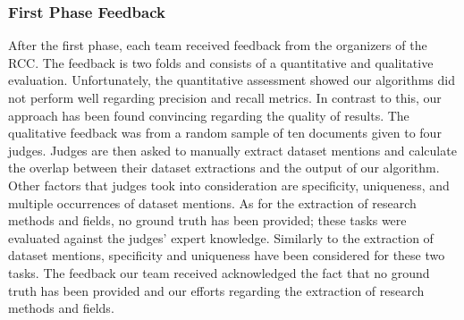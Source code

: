 \subsubsection{First Phase Feedback}
After the first phase, each team received feedback from the organizers of the RCC.
The feedback is two folds and consists of a quantitative and qualitative evaluation. Unfortunately, the quantitative assessment showed our algorithms did not perform well regarding precision and recall metrics. In contrast to this, our approach has been found convincing regarding the quality of results. The qualitative feedback was from a random sample of ten documents given to four judges.
Judges are then asked to manually extract dataset mentions and calculate the overlap between their dataset extractions and the output of our algorithm.
Other factors that judges took into consideration are specificity, uniqueness, and multiple occurrences of dataset mentions.
As for the extraction of research methods and fields, no ground truth has been provided; these tasks were evaluated against the judges' expert knowledge.
Similarly to the extraction of dataset mentions, specificity and uniqueness have been considered for these two tasks.
The feedback our team received acknowledged the fact that no ground truth has been provided and our efforts regarding the extraction of research methods and fields.
